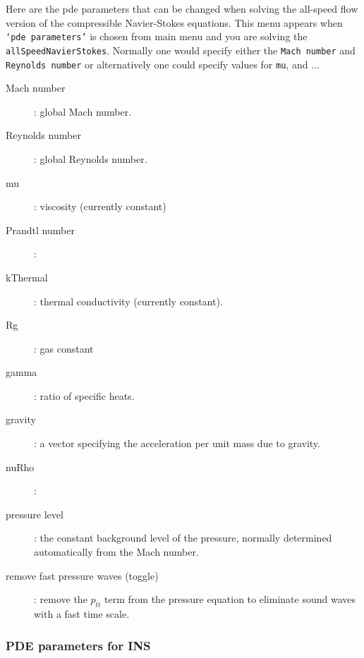  Here are the pde parameters that can be changed when solving the all-speed flow version of the
  compressible Navier-Stokes equations.
 This menu appears when {\tt `pde parameters'} is chosen from main menu and you are solving the 
  {\tt allSpeedNavierStokes}. 
 Normally one would specify either the {\tt Mach number} and {\tt Reynolds number}
  or alternatively one could specify values for {\tt mu}, and ...
\begin{description}
  \item[Mach number] : global Mach number.
  \item[Reynolds number] : global Reynolds number.
  \item[mu] : viscosity (currently constant)
  \item[Prandtl number] : 
  \item[kThermal] : thermal conductivity (currently constant).
  \item[Rg] : gas constant
  \item[gamma] : ratio of specific heats.
  \item[gravity] : a vector specifying the acceleration per unit mass due to gravity.
  \item[nuRho] :
  \item[pressure level] : the constant background level of the pressure, normally determined automatically
     from the Mach number.
  \item[remove fast pressure waves (toggle)] : remove the $p_{tt}$ term from the pressure equation to
       eliminate sound waves with a fast time scale.
 \end{description}

\subsubsection{PDE parameters for INS}\label{sec:pdeParams}
 

